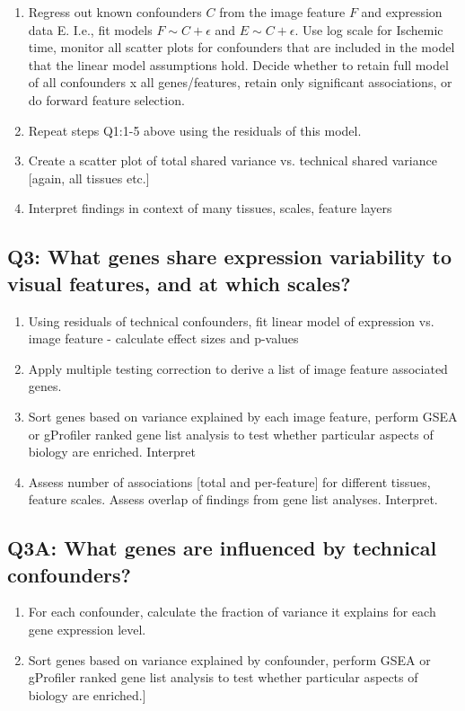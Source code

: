 \documentclass{article}
\begin{document}
\begin{enumerate}
\item Regress out known confounders $C$ from the image feature $F$ and expression data E. I.e., fit models $F \sim C + \epsilon$ and $E \sim C + \epsilon$. Use log scale for Ischemic time, monitor all scatter plots for confounders that are included in the model that the linear model assumptions hold. Decide whether to retain full model of all confounders x all genes/features, retain only significant associations, or do forward feature selection.

\item Repeat steps Q1:1-5 above using the residuals of this model. 

\item Create a scatter plot of total shared variance vs. technical shared variance [again, all tissues etc.]

\item Interpret findings in context of many tissues, scales, feature layers
\end{enumerate}

\subsection*{Q3: What genes share expression variability to visual features, and at which scales?}
\begin{enumerate}
\item Using residuals of technical confounders, fit linear model of expression vs. image feature - calculate effect sizes and p-values

\item Apply multiple testing correction to derive a list of image feature associated genes.

\item Sort genes based on variance explained by each image feature, perform GSEA or gProfiler ranked gene list analysis to test whether particular aspects of biology are enriched. Interpret

\item Assess number of associations [total and per-feature] for different tissues, feature scales. Assess overlap of findings from gene list analyses. Interpret.
\end{enumerate}

\subsection*{Q3A: What genes are influenced by technical confounders?}
\begin{enumerate}

\item For each confounder, calculate the fraction of variance it explains for each gene expression level. 

\item Sort genes based on variance explained by confounder, perform GSEA or gProfiler ranked gene list analysis to test whether particular aspects of biology are enriched.]

\end{enumerate}
\end{document}
